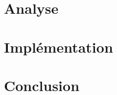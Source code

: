 \documentclass[
		oneside,numbers=noenddot,headinclude,
	 	footinclude=true,cleardoublepage=empty,
		dottedtoc,paper=a4,fontsize=12pt,
        utf8,
]{scrreport}
\begin{document}
    \chapter{Analyse}\label{sec:conception}
    

    \chapter{Implémentation}\label{cha:presentation-des-resultats}
    

    \chapter*{Conclusion}\label{cha:conlusion}
    

    \printbibliography
\end{document}
